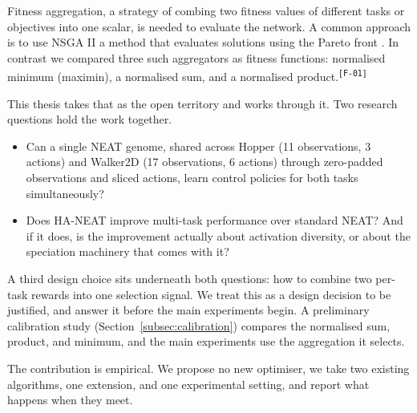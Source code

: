 \documentclass[12pt]{article}
\newcommand{\cohID}[1]{\textsuperscript{\scriptsize\texttt{[#1]}}}
\newcommand{\cohFlow}[2]{\textcolor{cohFlow}{#2}\cohID{#1}}
\providecommand{\parentcite}[1]{\parencite{#1}}
\begin{document}
Fitness aggregation, a strategy of combing two fitness values of different tasks or objectives into one scalar, is needed to evaluate the network. 
A common approach is to use NSGA II a method that evaluates solutions using the Pareto front \parentcite{deb_fast_2002}.
\cohFlow{F-01}{In contrast we compared three such aggregators as fitness functions:  normalised minimum (maximin), a normalised sum, and a normalised product.}



This thesis takes that as the open territory and works through it.
Two research questions hold the work together.
\begin{itemize}
    \item Can a single NEAT genome, shared across Hopper (11 observations, 3 actions) and Walker2D (17 observations, 6 actions) through zero-padded observations and sliced actions, learn control policies for both tasks simultaneously?
    \item Does HA-NEAT improve multi-task performance over standard NEAT? And if it does, is the improvement actually about activation diversity, or about the speciation machinery that comes with it?
\end{itemize}
A third design choice sits underneath both questions: how to combine two per-task rewards into one selection signal.
We treat this as a design decision to be justified, and answer it before the main experiments begin.
A preliminary calibration study (Section~\ref{subsec:calibration}) compares the normalised sum, product, and minimum, and the main experiments use the aggregation it selects.

The contribution is empirical.
We propose no new optimiser, we take two existing algorithms, one extension, and one experimental setting, and report what happens when they meet.
\end{document}
